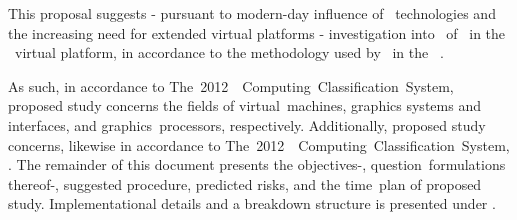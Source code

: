 \noindent
This proposal suggests - pursuant to  modern-day influence of \termgpu\ technologies and the increasing need for extended virtual platforms - investigation into \termparavirtualization\ of \termopengles\ in the \termsimics\ virtual platform, in accordance to the methodology used by \termgoogle\ in the \termandroid ~\termsdk .

As such, in accordance to The~2012~\termacm ~Computing~Classification~System, proposed study concerns the fields of virtual~machines, graphics systems and interfaces,  and graphics~processors, respectively. Additionally, proposed study concerns, likewise in accordance to The~2012~\termacm ~Computing~Classification~System, \termintel .
The remainder of this document presents the objectives-, question~formulations thereof-, suggested procedure, predicted risks, and the time~plan of proposed study.
Implementational details and a breakdown structure is presented under .
